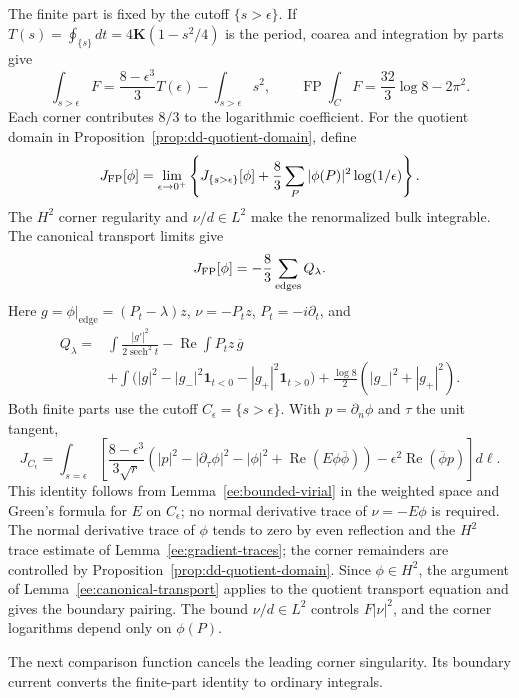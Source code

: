 \documentclass[reqno,11pt]{amsart}
\numberwithin{equation}{section}
\theoremstyle{remark}
\begin{document}
The finite part is fixed by the cutoff $\{s>\epsilon\}$.
If $T(s)=\oint_{\{s\}}dt=4\mathbf K(1-s^2/4)$ is the period, coarea
and integration by parts give
\[
 \int_{s>\epsilon}F
 =\frac{8-\epsilon^3}{3}T(\epsilon)-\int_{s>\epsilon}s^2,
 \qquad
 \operatorname{FP}\int_C F=\frac{32}{3}\log8-2\pi^2.
\]
Each corner contributes $8/3$ to the logarithmic coefficient.
For the quotient domain in Proposition~\ref{prop:dd-quotient-domain}, define
\[
 J_{\rm FP}[\phi]
 =\lim_{\epsilon\to0^+}\left\{
 J_{\{s>\epsilon\}}[\phi]
 +\frac83\sum_P|\phi(P)|^2\log(1/\epsilon)\right\}.
\]
The $H^2$ corner regularity and $\nu/d\in L^2$ make the
renormalized bulk integrable. The canonical transport limits give
\[
 J_{\rm FP}[\phi]=-\frac83\sum_{\text{edges}}Q_\lambda.
\]
Here $g=\phi|_{\text{edge}}=(P_t-\lambda)z$, $\nu=-P_tz$,
$P_t=-i\partial_t$, and
\begin{align*}
 Q_\lambda={}&\int\frac{|g'|^2}{2\operatorname{sech}^2t}
                 -\operatorname{Re}\int P_tz\,\overline g\\
 &+\int\bigl(|g|^2-|g_-|^2\mathbf1_{t<0}
                         -|g_+|^2\mathbf1_{t>0}\bigr)
       +\frac{\log8}{2}(|g_-|^2+|g_+|^2).
\end{align*}
Both finite parts use the cutoff $C_\epsilon=\{s>\epsilon\}$.
With $p=\partial_n\phi$ and
$\tau$ the unit tangent,
\[
 J_{C_\epsilon}=\int_{s=\epsilon}\left[
 \frac{8-\epsilon^3}{3\sqrt r}
 (|p|^2-|\partial_\tau\phi|^2-|\phi|^2+
                   \operatorname{Re}(E\phi\overline\phi))
              -\epsilon^2\operatorname{Re}(\overline\phi p)\right]d\ell.
\]
This identity follows from Lemma~\ref{ee:bounded-virial} in the weighted
space and Green's formula for $E$ on $C_\epsilon$; no normal
derivative trace of $\nu=-E\phi$ is required.
The normal derivative trace of $\phi$ tends to zero by even reflection and the
$H^2$ trace estimate of Lemma~\ref{ee:gradient-traces}; the corner
remainders are controlled by Proposition~\ref{prop:dd-quotient-domain}.
Since $\phi\in H^2$, the argument of Lemma~\ref{ee:canonical-transport}
applies to the quotient transport equation and gives the boundary pairing.
The bound $\nu/d\in L^2$ controls $F|\nu|^2$, and the corner
logarithms depend only on $\phi(P)$.

The next comparison function cancels the leading corner singularity.
Its boundary current converts the finite-part identity to ordinary integrals.
\end{document}
